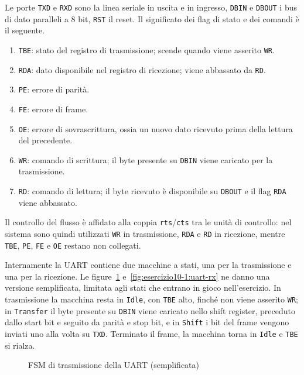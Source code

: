 Le porte \texttt{TXD} e \texttt{RXD} sono la linea seriale in uscita e in ingresso, \texttt{DBIN} e \texttt{DBOUT} i bus di dato paralleli a 8 bit, \texttt{RST} il reset. Il significato dei flag di stato e dei comandi è il seguente.
\begin{enumerate}
  \item \texttt{TBE}: stato del registro di trasmissione; scende quando viene asserito \texttt{WR}.
  \item \texttt{RDA}: dato disponibile nel registro di ricezione; viene abbassato da \texttt{RD}.
  \item \texttt{PE}: errore di parità.
  \item \texttt{FE}: errore di frame.
  \item \texttt{OE}: errore di sovrascrittura, ossia un nuovo dato ricevuto prima della lettura del precedente.
  \item \texttt{WR}: comando di scrittura; il byte presente su \texttt{DBIN} viene caricato per la trasmissione.
  \item \texttt{RD}: comando di lettura; il byte ricevuto è disponibile su \texttt{DBOUT} e il flag \texttt{RDA} viene abbassato.
\end{enumerate}
Il controllo del flusso è affidato alla coppia \texttt{rts}/\texttt{cts} tra le unità di controllo: nel sistema sono quindi utilizzati \texttt{WR} in trasmissione, \texttt{RDA} e \texttt{RD} in ricezione, mentre \texttt{TBE}, \texttt{PE}, \texttt{FE} e \texttt{OE} restano non collegati.

Internamente la UART contiene due macchine a stati, una per la trasmissione e una per la ricezione. Le figure~\ref{fig:esercizio10-1:uart-tx} e~\ref{fig:esercizio10-1:uart-rx} ne danno una versione semplificata, limitata agli stati che entrano in gioco nell'esercizio. In trasmissione la macchina resta in \texttt{Idle}, con \texttt{TBE} alto, finché non viene asserito \texttt{WR}; in \texttt{Transfer} il byte presente su \texttt{DBIN} viene caricato nello shift register, preceduto dallo start bit e seguito da parità e stop bit, e in \texttt{Shift} i bit del frame vengono inviati uno alla volta su \texttt{TXD}. Terminato il frame, la macchina torna in \texttt{Idle} e \texttt{TBE} si rialza.

\begin{figure}[H]
  \centering
  \caption{FSM di trasmissione della UART (semplificata)}
  \label{fig:esercizio10-1:uart-tx}
\end{figure}

